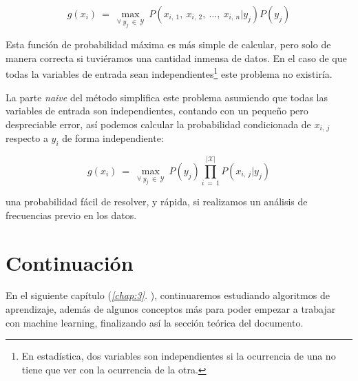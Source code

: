 $$
g(x_{i})\:=\:\max_{\forall\:y_{j}\:\in\:\mathcal{Y}}\:P(x_{i,\:1},\:x_{i,\:2},\:\dots,\:x_{i,\:n}|y_{j})P(y_{j})
$$

Esta función de probabilidad máxima es más simple de calcular, pero solo de manera correcta si tuviéramos una cantidad inmensa de datos. En el caso de que todas la variables de entrada sean independientes\footnote{En estadística, dos variables son independientes si la ocurrencia de una no tiene que ver con la ocurrencia de la otra.} este problema no existiría.

La parte \emph{naive} del método simplifica este problema asumiendo que todas las variables de entrada son independientes, contando con un pequeño pero despreciable error, así podemos calcular la probabilidad condicionada de $x_{i,\:j}$ respecto a $y_{i}$ de forma independiente:

$$
g(x_{i})\:=\:\max_{\forall\:y_{j}\:\in\:\mathcal{Y}}\:P(y_{j})\prod_{i\:=\:1}^{|\mathcal{X}|}P(x_{i,\:j}|y_{j})
$$

\noindent
una probabilidad fácil de resolver, y rápida, si realizamos un análisis de frecuencias previo en los datos.

\section{Continuación} \label{sec:2.6}

En el siguiente capítulo (\emph{\ref{chap:3}. }), continuaremos estudiando algoritmos de aprendizaje, además de algunos conceptos más para poder empezar a trabajar con machine learning, finalizando así la sección teórica del documento.
